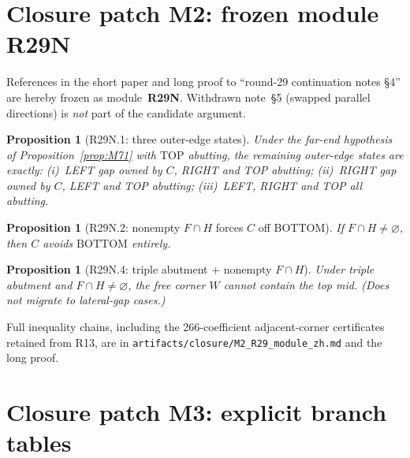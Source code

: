 \documentclass[11pt,reqno]{amsart}
\newtheorem{proposition}[theorem]{Proposition}
\theoremstyle{definition}
\newcommand{\BOTTOM}{\mathrm{BOTTOM}}
\newcommand{\TOP}{\mathrm{TOP}}
\begin{document}
\section{Closure patch M2: frozen module R29N}\label{app:M2}

References in the short paper and long proof to ``round-29 continuation notes
\S4'' are hereby frozen as module~\textbf{R29N}.  Withdrawn note~\S5 (swapped
parallel directions) is \emph{not} part of the candidate argument.

\begin{proposition}[R29N.1: three outer-edge states]\label{prop:R29N1}
Under the far-end hypothesis of Proposition~\ref{prop:M71} with $\TOP$
abutting, the remaining outer-edge states are exactly: (i)~LEFT gap owned by
$C$, RIGHT and TOP abutting; (ii)~RIGHT gap owned by $C$, LEFT and TOP
abutting; (iii)~LEFT, RIGHT and TOP all abutting.
\end{proposition}

\begin{proposition}[R29N.2: nonempty $F\cap H$ forces $C$ off BOTTOM]\label{prop:R29N2}
If $F\cap H\neq\varnothing$, then $C$ avoids $\BOTTOM$ entirely.
\end{proposition}

\begin{proposition}[R29N.4: triple abutment + nonempty $F\cap H$]\label{prop:R29N4}
Under triple abutment and $F\cap H\neq\varnothing$, the free corner $W$ cannot
contain the top mid.  (Does not migrate to lateral-gap cases.)
\end{proposition}

Full inequality chains, including the 266-coefficient adjacent-corner
certificates retained from R13, are in
\texttt{artifacts/closure/M2\_R29\_module\_zh.md} and the long proof.

\section{Closure patch M3: explicit branch tables}\label{app:M3}
\end{document}
